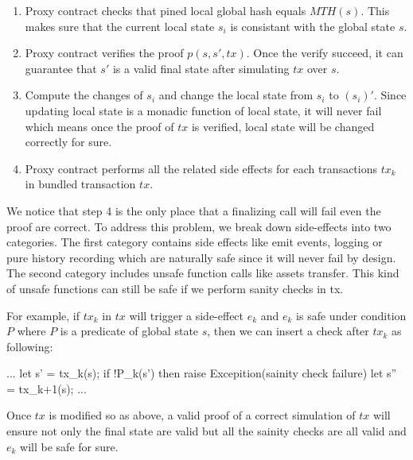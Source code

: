 \documentclass[acmtog, natbib=false]{acmart}
\newenvironment{code}%
   {\snugshade\verbatim}%
   {\endverbatim\endsnugshade}
\begin{document}
\begin{enumerate}[leftmargin=*]
\item Proxy contract checks that pined local global hash equals $MTH(s)$. This makes sure that the current local state $s_i$ is consistant with the global state $s$.

\item Proxy contract verifies the proof $p(s, s', tx)$. Once the verify succeed, it can guarantee that $s'$ is a valid final state after simulating $tx$ over $s$.

\item Compute the changes of $s_i$ and change the local state from $s_i$ to $(s_i)'$. Since updating local state is a monadic function of local state, it will never fail which means once the proof of $tx$ is verified, local state will be changed correctly for sure.

\item Proxy contract performs all the related side effects for each transactions $tx_k$ in bundled transaction $tx$. 
\end{enumerate}

We notice that step 4 is the only place that a finalizing call will fail even the proof are correct. To address this problem, we break down side-effects into two categories. The first category contains side effects like emit events, logging or pure history recording which are naturally safe since it will never fail by design. The second category includes unsafe function calls like assets transfer. This kind of unsafe functions can still be safe if we perform sanity checks in tx.

For example, if $tx_k$ in $tx$ will trigger a side-effect $e_k$ and $e_k$ is safe under condition $P$ where $P$ is a predicate of global state $s$, then we can insert a check after $tx_k$ as following:

\begin{code}
...
let s' = tx_k(s);
if !P_k(s') then raise Excepition(sainity check failure)
let s'' = tx_{k+1}(s);
...
\end{code}

Once $tx$ is modified so as above, a valid proof of a correct simulation of $tx$ will ensure not only the final state are valid but all the sainity checks are all valid and $e_k$ will be safe for sure.
\end{document}
